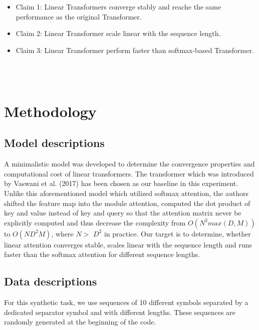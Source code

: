 \documentclass[DIV=13,fontsize=11pt]{scrartcl}
\begin{document}
\begin{itemize}
    \item Claim 1: Linear Transformers converge stably and reache the same performance as the original Transformer.
    \item Claim 2: Linear Transformer scale linear with the sequence length.
    \item Claim 3: Linear Transformer perform faster than softmax-based Transformer.
\end{itemize} \\

\\ \section{Methodology}


\subsection{Model descriptions}
A minimalistic model was developed to determine the convergence properties and computational cost of linear transformers. The transformer which was introduced by Vaswani et al. (2017) has been chosen as our baseline in this experiment. Unlike this aforementioned model which utilized softmax attention, the authors shifted the feature map into the module attention, computed the dot product of key and value instead of key and query so that the attention matrix never be explicitly computed and thus decrease the complexity from \(O(N^2 max(D,M))\) to \(O(ND^2M)\), where \(N >\) \(D^2\) in practice. Our target is to determine, whether linear attention converges stable, scales linear with the sequence length and runs faster than the softmax attention for different sequence lengths.

\subsection{Data descriptions}
For this synthetic task, we use sequences of 10 different symbols separated by a dedicated separator symbol and with different lengths. These sequences are randomly generated at the beginning of the code.
\end{document}
